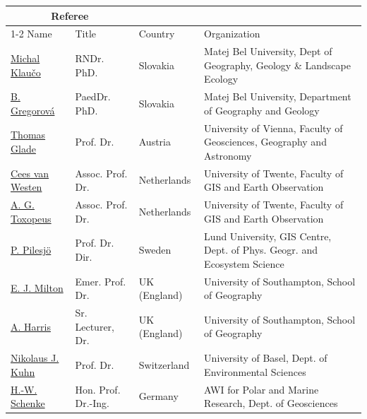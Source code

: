 \documentclass[10pt]{article}
\begin{document}
\begin{tabular}{p{2.7cm} p{3cm} p{2.5cm} p{6cm}}  
\toprule
\multicolumn{2}{c}{\textbf{Referee}} \\
\cmidrule(r){1-2}
Name & Title & Country & Organization \\
\midrule
\rowcolor{Lavender}
	\href{https://drive.google.com/file/d/1PUFvQkLrY8ZMwK_pzK_R8R20Dp982U1W/view?usp=sharing}{Michal Klau\v{c}o} & RNDr. PhD. & Slovakia & Matej Bel University, Dept of Geography, Geology \& Landscape Ecology\\
	\href{https://drive.google.com/file/d/1zdeVOFVFPKBZ4024KCJzGKngkC5-IfLM/view?usp=sharing}{B. Gregorová} & PaedDr. PhD. & Slovakia & Matej Bel University, Department of Geography and Geology \\
\rowcolor{Lavender}
	\href{https://drive.google.com/file/d/1Qt-S-5AbajT0SChMXJrifLQg6CRaWuiN/view?usp=sharing}{Thomas Glade} & Prof. Dr. & Austria & University of Vienna, Faculty of Geosciences, Geography and Astronomy \\
	\href{https://drive.google.com/file/d/11-IoaxsmsiHGeDOlpT_oF4ruDVdgSf6I/view?usp=sharing}{Cees van Westen} & Assoc. Prof. Dr. & Netherlands & University of Twente, Faculty of GIS and Earth Observation \\
\rowcolor{Lavender}
	\href{https://drive.google.com/file/d/1_3zIh0jxsPIX9BWuITK4bAbqbXqsx5Um/view?usp=sharing}{A. G. Toxopeus} & Assoc. Prof. Dr. & Netherlands & University of Twente, Faculty of GIS and Earth Observation\\
	\href{https://drive.google.com/file/d/1kSNt05NEZwb8ptl8CAKkQfGuUlt8tUj9/view?usp=sharing}{P. Pilesj\"{o}} & Prof. Dr. Dir. & Sweden & Lund University, GIS Centre, Dept. of Phys. Geogr. and Ecosystem Science \\
\rowcolor{Lavender}
	\href{https://drive.google.com/file/d/1k_S4zYuXzJbQ2lixuqVriK9Pt9m_ck1L/view?usp=sharing}{E. J. Milton} & Emer. Prof. Dr. & UK (England) & University of Southampton,  School of Geography \\
	\href{https://drive.google.com/file/d/1927nFOzndI4IMoP7FH7a-mTL6oUAwciq/view?usp=sharing}{A. Harris} & Sr. Lecturer, Dr. & UK (England) & University of Southampton, School of Geography\\
\rowcolor{Lavender}
	\href{https://drive.google.com/file/d/1oFz8JTVuggPcNsPiRXEVFqg3RuC5S-qQ/view?usp=sharing}{Nikolaus J. Kuhn}  & Prof. Dr. & Switzerland & University of Basel, Dept. of Environmental Sciences \\
	\href{https://drive.google.com/file/d/1mMEDsJv8DA5YfcVBIpF-iSUp6RJINrnh/view?usp=sharing}{H.-W. Schenke} & Hon. Prof. Dr.-Ing.  & Germany & AWI for Polar and Marine Research, Dept. of Geosciences\\

\end{tabular}
\end{document}

